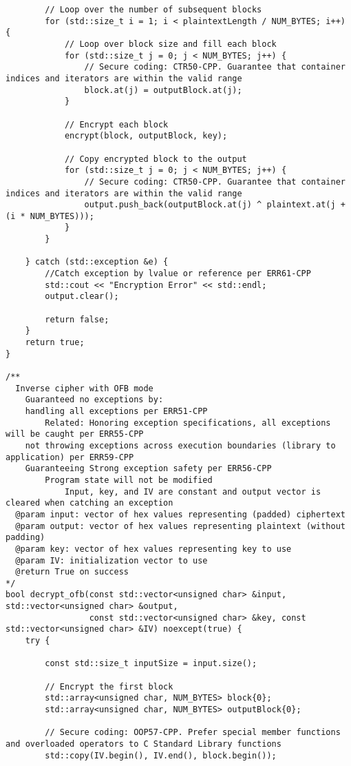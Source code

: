 \documentclass[a4paper,12pt]{article}
\begin{document}
{\begin{lstlisting}
        // Loop over the number of subsequent blocks
        for (std::size_t i = 1; i < plaintextLength / NUM_BYTES; i++) {
            // Loop over block size and fill each block
            for (std::size_t j = 0; j < NUM_BYTES; j++) {
                // Secure coding: CTR50-CPP. Guarantee that container indices and iterators are within the valid range
                block.at(j) = outputBlock.at(j);
            }

            // Encrypt each block
            encrypt(block, outputBlock, key);

            // Copy encrypted block to the output
            for (std::size_t j = 0; j < NUM_BYTES; j++) {
                // Secure coding: CTR50-CPP. Guarantee that container indices and iterators are within the valid range
                output.push_back(outputBlock.at(j) ^ plaintext.at(j + (i * NUM_BYTES)));
            }
        }

    } catch (std::exception &e) {
        //Catch exception by lvalue or reference per ERR61-CPP
        std::cout << "Encryption Error" << std::endl;
        output.clear();

        return false;
    }
    return true;
}

/**
  Inverse cipher with OFB mode
    Guaranteed no exceptions by:
    handling all exceptions per ERR51-CPP
        Related: Honoring exception specifications, all exceptions will be caught per ERR55-CPP
    not throwing exceptions across execution boundaries (library to application) per ERR59-CPP
    Guaranteeing Strong exception safety per ERR56-CPP
        Program state will not be modified
            Input, key, and IV are constant and output vector is cleared when catching an exception
  @param input: vector of hex values representing (padded) ciphertext
  @param output: vector of hex values representing plaintext (without padding)
  @param key: vector of hex values representing key to use
  @param IV: initialization vector to use
  @return True on success
*/
bool decrypt_ofb(const std::vector<unsigned char> &input, std::vector<unsigned char> &output,
                 const std::vector<unsigned char> &key, const std::vector<unsigned char> &IV) noexcept(true) {
    try {

        const std::size_t inputSize = input.size();

        // Encrypt the first block
        std::array<unsigned char, NUM_BYTES> block{0};
        std::array<unsigned char, NUM_BYTES> outputBlock{0};

        // Secure coding: OOP57-CPP. Prefer special member functions and overloaded operators to C Standard Library functions
        std::copy(IV.begin(), IV.end(), block.begin());


\end{lstlisting}}
\end{document}
